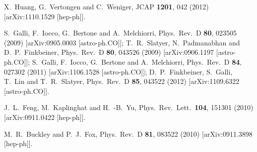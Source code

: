   X.~Huang, G.~Vertongen and C.~Weniger,
  JCAP {\bf 1201}, 042 (2012)
  [arXiv:1110.1529 [hep-ph]].

  S.~Galli, F.~Iocco, G.~Bertone and A.~Melchiorri,
  Phys.\ Rev.\ D {\bf 80}, 023505 (2009)
  [arXiv:0905.0003 [astro-ph.CO]];
  T.~R.~Slatyer, N.~Padmanabhan and D.~P.~Finkbeiner,
  Phys.\ Rev.\ D {\bf 80}, 043526 (2009)
  [arXiv:0906.1197 [astro-ph.CO]];
  S.~Galli, F.~Iocco, G.~Bertone and A.~Melchiorri,
  Phys.\ Rev.\ D {\bf 84}, 027302 (2011)
  [arXiv:1106.1528 [astro-ph.CO]];
  D.~P.~Finkbeiner, S.~Galli, T.~Lin and T.~R.~Slatyer,
  Phys.\ Rev.\ D {\bf 85}, 043522 (2012)
  [arXiv:1109.6322 [astro-ph.CO]].

  J.~L.~Feng, M.~Kaplinghat and H.~-B.~Yu,
  Phys.\ Rev.\ Lett.\  {\bf 104}, 151301 (2010)
  [arXiv:0911.0422 [hep-ph]].

  M.~R.~Buckley and P.~J.~Fox,
  Phys.\ Rev.\ D {\bf 81}, 083522 (2010)
  [arXiv:0911.3898 [hep-ph]].


  
